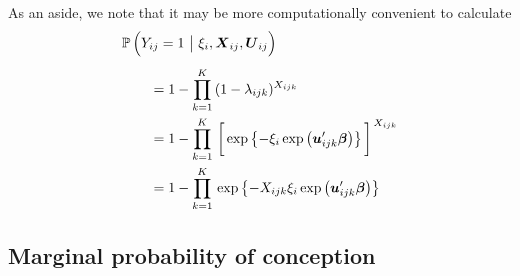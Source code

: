 \documentclass[11pt]{article}
\newcommand{\prob}{\mathbb{P}\,}
\renewcommand{\vec}{\boldsymbol}
\begin{document}
As an aside, we note that it may be more computationally convenient to calculate
\begin{align*} \MoveEqLeft
\prob\Big( Y_{ij} = 1 ~\big|~ \xi_i, \vec{X}_{ij}, \vec{U}_{ij}  \Big) \\[1ex]
&= 1 - \prod_{k=1}^K\, (1 - \lambda_{ijk})^{X_{ijk}} \\
&= 1 - \prod_{k=1}^K\, \bigg[ \exp \left\{ -\xi_i \exp\left( \vec{u}_{ijk}^\prime \vec{\beta} \right) \right\} \bigg]^{\,X_{ijk}} \\
&= 1 - \prod_{k=1}^K\, \exp \left\{ -X_{ijk} \xi_i \exp\left( \vec{u}_{ijk}^\prime \vec{\beta} \right) \right\} \\
\end{align*}







\subsection{Marginal probability of conception}
\end{document}
